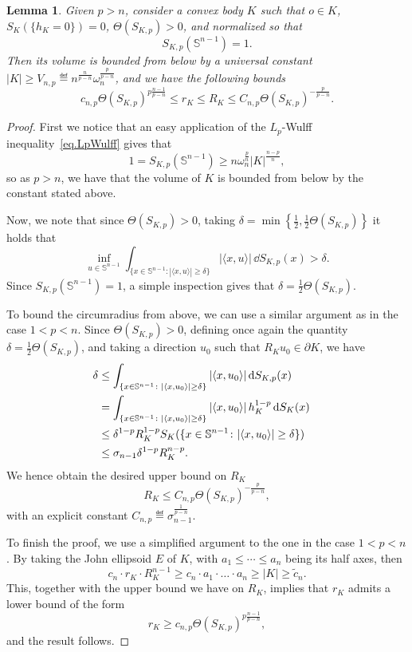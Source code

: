 \documentclass[a4paper, 10pt, twoside]{amsart}
\numberwithin{equation}{section}
\newcommand{\lemmname}{Lemma}
\theoremstyle{plain}
\newtheorem{lemma}[theorem]{\lemmname}
\theoremstyle{definition}
\begin{document}
\begin{lemma}\label{lemma.rR_Lp>n}
    Given $p>n$, consider a convex body $K$ such that $o \in K$, $S_K(\{h_K=0\})=0$, $\Theta(S_{K,p}) > 0$, and normalized so that 
    \[
        S_{K,p}(\mathbb{S}^{n-1}) = 1.
    \]
    Then its volume is bounded from below by a universal constant $|K| \ge V_{n,p} \eqdef n^{\frac{n}{p-n}} \omega_n^{\frac{p}{p-n}}$, and we have the following bounds 
    \[
        c_{n,p} \Theta(S_{K,p})^{p\frac{n-1}{p-n}}
        \le 
        r_K \le R_K 
        \le C_{n,p} \Theta(S_{K,p})^{-\frac{p}{p-n}}.
    \]
\end{lemma}
\begin{proof}
    First we notice that an easy application of the $L_p$-Wulff inequality~\eqref{eq.LpWulff} gives that 
    \[ 
    1 = S_{K,p}(\mathbb{S}^{n-1}) \ge n \omega_n^{\frac{p}{n}} 
    |K|^{\frac{n-p}{n}}, 
    \] 
    so as $p > n$, we have that the volume of $K$ is bounded from below by the constant stated above. 

    Now, we note that since $\Theta(S_{K,p}) > 0$, taking  $\delta = \min\left\{\frac{1}{2},\frac{1}{2}\Theta(S_{K,p})\right\}$ it holds that 
\[
    \inf_{u \in \mathbb{S}^{n-1}} \int_{\{ x \in \mathbb{S}^{n-1} \colon |\langle x, u \rangle| \ge \delta\}} |\langle x,u\rangle| \, \dd S_{K,p}(x) > \delta. 
\]
Since $S_{K,p}(\mathbb{S}^{n-1}) = 1$, a simple inspection gives that $\delta = \frac{1}{2}\Theta(S_{K,p})$. 


To bound the circumradius from above, we can use a similar argument as in the case $1 < p < n$. Since $\Theta(S_{K,p}) > 0$, defining once again the quantity $\delta = \frac{1}{2}\Theta(S_{K,p})$, and taking a direction $u_0$ such that $R_K u_0 \in \partial K$, we have 
\begin{align*}%
    \delta 
    & \le 
    \int_{
        \{x \in \mathbb{S}^{n-1} \colon |\langle x,u_0\rangle| \ge \delta\}
    } 
    |\langle x, u_0\rangle| \, 
    \dd S_{K,p}(x) \cr 
    & = 
    \int_{
        \{x \in \mathbb{S}^{n-1} \colon |\langle x,u_0\rangle| \ge \delta\}
    } |\langle x,u_0\rangle| \, h_{K}^{1-p} \, 
    \dd S_K(x) \cr 
    & \le \delta^{1-p} R_K^{1-p} S_K(\{x \in \mathbb{S}^{n-1} \colon |\langle x,u_0\rangle| \ge \delta\}) \cr
    & \le \sigma_{n-1} \delta^{1-p} R_K^{n-p}.
\end{align*}
We hence obtain the desired upper bound on $R_K$
\begin{equation} 
R_K \le C_{n,p} \Theta(S_{K,p})^{-\frac{p}{p-n}},  
\end{equation}
with an explicit constant $C_{n,p} \eqdef \sigma_{n-1}^{\frac{1}{p-n}}$. 
    
    To finish the proof, we use a simplified argument to the one in the case $1 < p < n$. By taking the John ellipsoid  $E$ of $K$, with $a_1 \le \cdots \le a_n$ being its half axes, then 
    \[
        c_n \cdot r_K \cdot R_K^{n-1} 
        \ge 
        c_n \cdot a_1 \cdot \dots \cdot a_n \ge |K|
        \ge 
        \tilde{c}_n. 
    \]
    This, together with the upper bound we have on $R_K$, implies that $r_K$ admits a lower bound of the form 
    \[
        r_K \ge c_{n,p} \Theta(S_{K,p})^{p\frac{n-1}{p-n}},
    \]
    and the result follows.
\end{proof}
\end{document}
